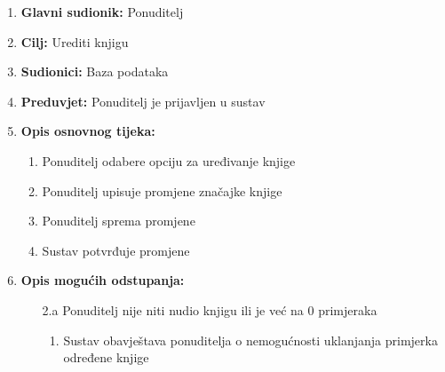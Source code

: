 \documentclass[12pt]{report}
\begin{document}
\noindent {}
\begin{enumerate}
	
	\item \textbf{Glavni sudionik: } Ponuditelj
	\item  \textbf{Cilj:} Urediti knjigu
	\item  \textbf{Sudionici:} Baza podataka
	\item  \textbf{Preduvjet:} Ponuditelj je prijavljen u sustav
	\item  \textbf{Opis osnovnog tijeka:}
	
	\begin{enumerate}
		
		\item Ponuditelj odabere opciju za uređivanje knjige
		\item Ponuditelj upisuje promjene značajke knjige 
		\item Ponuditelj sprema promjene
		\item Sustav potvrđuje promjene
		
	\end{enumerate}
	
	\item  \textbf{Opis mogućih odstupanja:}
	
	\item[] \begin{enumerate}
		
		\item[2.a] Ponuditelj nije niti nudio knjigu ili je već na 0 primjeraka 
		\item[] \begin{enumerate}
			
			\item Sustav obavještava ponuditelja o nemogućnosti uklanjanja primjerka određene knjige
			
		\end{enumerate}
		
	\end{enumerate}
	
\end{enumerate}
\end{document}
